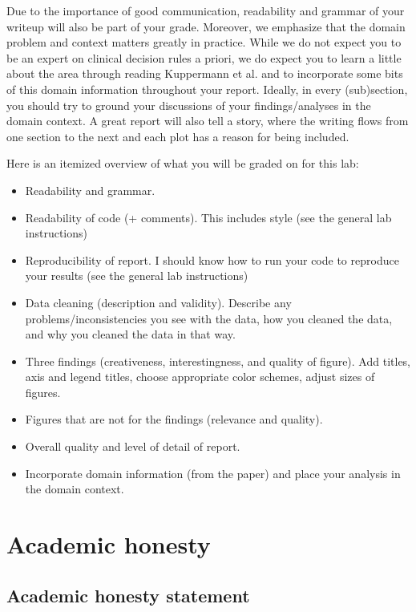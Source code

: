 \documentclass[10pt,letterpaper]{article}
\begin{document}
Due to the importance of good communication, readability and grammar of your writeup will also be part of your grade. Moreover, we emphasize that the domain problem and context matters greatly in practice. While we do not expect you to be an expert on clinical decision rules a priori, we do expect you to learn a little about the area through reading Kuppermann et al. and to incorporate some bits of this domain information throughout your report. Ideally, in every (sub)section, you should try to ground your discussions of your findings/analyses in the domain context. A great report will also tell a story, where the writing flows from one section to the next and each plot has a reason for being included.

Here is an itemized overview of what you will be graded on for this lab:
\begin{itemize}
    \item Readability and grammar.
    \item Readability of code (+ comments). This includes style (see the general lab instructions)
    \item Reproducibility of report. I should know how to run your code to reproduce your results (see the general lab instructions)
    \item Data cleaning (description and validity). Describe any problems/inconsistencies you see with the data, how you cleaned the data, and why you cleaned the data in that way.
    \item Three findings (creativeness, interestingness, and quality of figure). Add titles, axis and legend titles, choose appropriate color schemes, adjust sizes of figures.
    \item Figures that are not for the findings (relevance and quality).
    \item Overall quality and level of detail of report.
    \item Incorporate domain information (from the paper) and place your analysis in the domain context.
\end{itemize}

\section*{Academic honesty}

\subsection*{Academic honesty statement}
\end{document}
